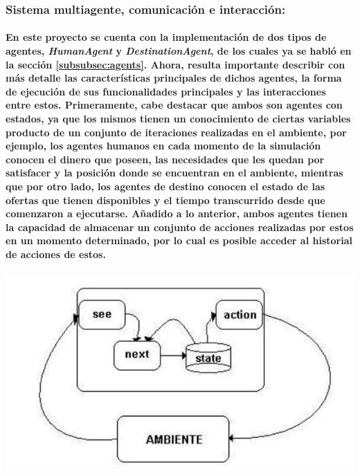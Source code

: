 \documentclass[12pt]{amsart}
\begin{document}
\subsubsection{Sistema multiagente, comunicación e interacción:}

\paragraph{En este proyecto se cuenta con la implementación de dos tipos de agentes, \textit{HumanAgent} y \textit{DestinationAgent}, de los cuales ya se habló en la sección \ref{subsubsec:agents}. Ahora, resulta importante describir con más detalle las características principales de dichos agentes, la forma de ejecución de sus funcionalidades principales y las interacciones entre estos. Primeramente, cabe destacar que ambos son agentes con estados, ya que los mismos tienen un conocimiento de ciertas variables producto de un conjunto de iteraciones realizadas en el ambiente, por ejemplo, los agentes humanos en cada momento de la simulación conocen el dinero que poseen, las necesidades que les quedan por satisfacer y la posición donde se encuentran en el ambiente,  mientras que por otro lado, los agentes de destino conocen el estado de las ofertas que tienen disponibles y el tiempo transcurrido desde que comenzaron a ejecutarse. Añadido a lo anterior, ambos agentes tienen la capacidad de almacenar un conjunto de acciones realizadas por estos en un momento determinado, por lo cual es posible acceder al historial de acciones de estos.}


	\includegraphics[scale=0.7]{./images/stateagents.png}
	\label{fig:stateagents}
\end{document}
